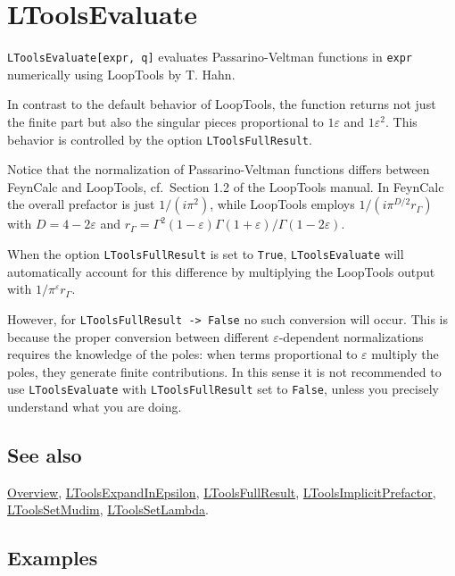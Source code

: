 \documentclass[../FeynHelpersManual.tex]{subfiles}
\begin{document}
\hypertarget{ltoolsevaluate}{
\section{LToolsEvaluate}\label{ltoolsevaluate}}

\texttt{LToolsEvaluate[\allowbreak{}expr,\ \allowbreak{}q]} evaluates
Passarino-Veltman functions in \texttt{expr} numerically using LoopTools
by T. Hahn.

In contrast to the default behavior of LoopTools, the function returns
not just the finite part but also the singular pieces proportional to
\(1\varepsilon\) and \(1\varepsilon^2\). This behavior is controlled by
the option \texttt{LToolsFullResult}.

Notice that the normalization of Passarino-Veltman functions differs
between FeynCalc and LoopTools, cf.~Section 1.2 of the LoopTools manual.
In FeynCalc the overall prefactor is just \(1/(i \pi^2)\), while
LoopTools employs \(1/(i \pi^{D/2} r_{\Gamma})\) with
\(D = 4 -2 \varepsilon\) and
\(r_{\Gamma} = \Gamma^2 (1 - \varepsilon) \Gamma (1 + \varepsilon) / \Gamma(1-2 \varepsilon)\).

When the option \texttt{LToolsFullResult} is set to \texttt{True},
\texttt{LToolsEvaluate} will automatically account for this difference
by multiplying the LoopTools output with
\(1/\pi^{\varepsilon} r_\Gamma\).

However, for \texttt{LToolsFullResult -> False} no such conversion will
occur. This is because the proper conversion between different
\(\varepsilon\)-dependent normalizations requires the knowledge of the
poles: when terms proportional to \(\varepsilon\) multiply the poles,
they generate finite contributions. In this sense it is not recommended
to use \texttt{LToolsEvaluate} with \texttt{LToolsFullResult} set to
\texttt{False}, unless you precisely understand what you are doing.

\subsection{See also}

\hyperlink{toc}{Overview},
\hyperlink{ltoolsexpandinepsilon}{LToolsExpandInEpsilon},
\hyperlink{ltoolsfullresult}{LToolsFullResult},
\hyperlink{ltoolsimplicitprefactor}{LToolsImplicitPrefactor},
\hyperlink{ltoolssetmudim}{LToolsSetMudim},
\hyperlink{ltoolssetlambda}{LToolsSetLambda}.

\subsection{Examples}
\end{document}

